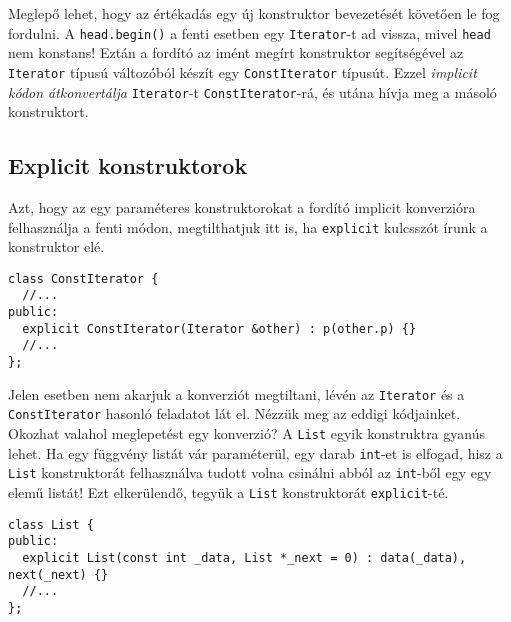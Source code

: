 \documentclass[../cpp_book/cpp_book.tex]{subfiles}
\begin{document}
	Meglepő lehet, hogy az értékadás egy új konstruktor bevezetését követően le fog fordulni. A \texttt{head.begin()} a fenti esetben egy \texttt{Iterator}-t ad vissza, mivel \texttt{head} nem konstans! Eztán a fordító az imént megírt konstruktor segítségével az \texttt{Iterator} típusú változóból készít egy \texttt{ConstIterator} típusút. Ezzel \textit{implicit kódon átkonvertálja} \texttt{Iterator}-t \texttt{ConstIterator}-rá, és utána hívja meg a másoló konstruktort. 
	
	\subsection{Explicit konstruktorok}
	Azt, hogy az egy paraméteres konstruktorokat a fordító implicit konverzióra felhasználja a fenti módon, megtilthatjuk itt is, ha \texttt{explicit} kulcsszót írunk a konstruktor elé.
	
	\begin{lstlisting}
class ConstIterator {
  //...
public:
  explicit ConstIterator(Iterator &other) : p(other.p) {}
  //...
};
	\end{lstlisting}
	Jelen esetben nem akarjuk a konverziót megtiltani, lévén az \texttt{Iterator} és a \texttt{ConstIterator} hasonló feladatot lát el. Nézzük meg az eddigi kódjainket. Okozhat valahol meglepetést egy konverzió? A \texttt{List} egyik konstruktra gyanús lehet. Ha egy függvény listát vár paraméterül, egy darab \texttt{int}-et is elfogad, hisz a \texttt{List} konstruktorát felhasználva tudott volna csinálni abból az \texttt{int}-ből egy egy elemű listát! Ezt elkerülendő, tegyük a \texttt{List} konstruktorát \texttt{explicit}-té.
	\begin{lstlisting}
class List {
public:
  explicit List(const int _data, List *_next = 0) : data(_data), next(_next) {}
  //...
};
	\end{lstlisting}
\end{document}
